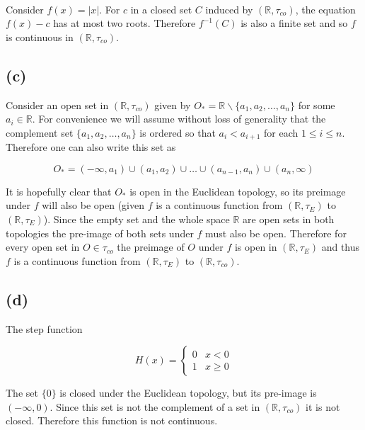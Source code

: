 \documentclass{article}
\begin{document}
\paragraph{}
Consider $f(x) = |x|$. For $c$ in a closed set $C$ induced by $(\mathbb{R},\tau_{co})$, the 
equation $f(x) - c$ has at most two roots. Therefore $f^{-1}(C)$ is also a finite set and 
so $f$ is continuous in $(\mathbb{R},\tau_{co})$.

\subsection*{(c)}
Consider an open set in $(\mathbb{R},\tau_{co})$ given by $O_* = \mathbb{R}\backslash\{a_1,a_2,\dots,a_n\}$ for some $a_i \in \mathbb{R}$. For 
convenience we will assume without loss of generality that the complement set $\{a_1,a_2,\dots,a_n\}$ is ordered so that $a_i < a_{i+1}$ 
for each $1 \leq i \leq n$. Therefore one can also write this set as 

\begin{equation*}
    O_* = (-\infty,a_1) \cup (a_1,a_2) \cup \dots \cup (a_{n-1},a_n) \cup (a_n,\infty)
\end{equation*}

It is hopefully clear that $O_*$ is open in the Euclidean topology, so its preimage under $f$ will 
also be open (given $f$ is a continuous function from $(\mathbb{R},\tau_{E})$ to $(\mathbb{R},\tau_{E})$). 
Since the empty set and the whole space $\mathbb{R}$ are open sets in both topologies the 
pre-image of both sets under $f$ must also be open. 
Therefore for every open set in $O \in \tau_{co}$ the preimage of $O$ under $f$ is open 
in $(\mathbb{R},\tau_{E})$ and thus $f$ is a continuous function from $(\mathbb{R},\tau_{E})$ to $(\mathbb{R},\tau_{co})$.

\subsection*{(d)}
The step function

\begin{equation*}
    H(x) = 
    \begin{cases}
        0 & x < 0 \\
        1 & x \geq 0
    \end{cases}
\end{equation*}

The set $\{0\}$ is closed under the Euclidean topology, but its pre-image is $(-\infty,0)$. Since 
this set is not the complement of a set in $(\mathbb{R},\tau_{co})$ it is not closed. Therefore 
this function is not continuous.
\end{document}
